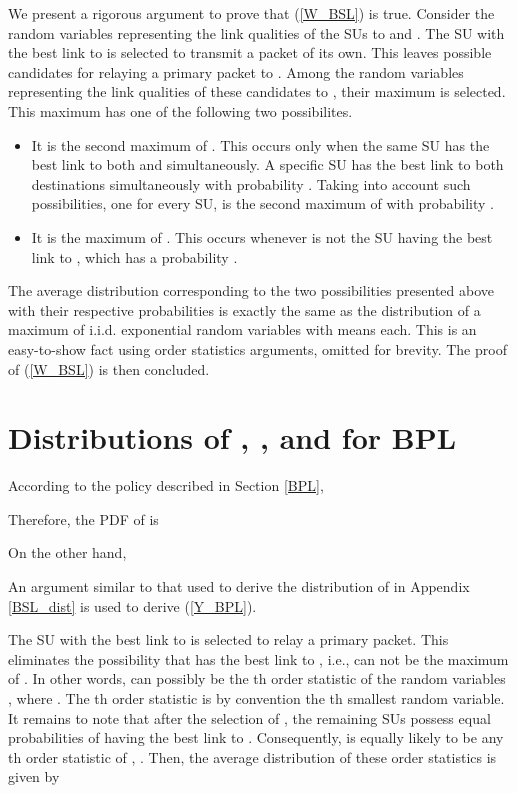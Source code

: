 \documentclass[journal,twocolumn]{IEEEtran}
\begin{document}
We present a rigorous argument to prove that (\ref{W_BSL}) is true. Consider the  random variables representing the link qualities of the  SUs to  and . The SU with the best link to  is selected to transmit a packet of its own. This leaves  possible candidates for relaying a primary packet to . Among the  random variables representing the link qualities of these candidates to , their maximum is selected. This maximum has one of the following two possibilites. 
\begin{itemize}
\item It is the second maximum of . This occurs only when the same SU has the best link to both  and  simultaneously. A specific SU has the best link to both destinations simultaneously with probability . Taking into account  such possibilities, one for every SU,  is the second maximum of  with probability . 
\item It is the maximum of . This occurs whenever  is not the SU having the best link to , which has a probability .       
\end{itemize}      
The average distribution corresponding to the two possibilities presented above with their respective probabilities is exactly the same as the distribution of a maximum of  i.i.d. exponential random variables with means  each. This is an easy-to-show fact using order statistics arguments, omitted for brevity. The proof of (\ref{W_BSL}) is then concluded. 


\section{Distributions of , , and  for BPL} \label{BPL_dist}
According to the policy described in Section \ref{BPL}, 

Therefore, the PDF of  is
     
On the other hand, 
 
An argument similar to that used to derive the distribution of  in Appendix \ref{BSL_dist} is used to derive (\ref{Y_BPL}).

The SU with the best link to  is selected to relay a primary packet. This eliminates the possibility that  has the best link to , i.e.,  can not be the maximum of . In other words,  can possibly be the th order statistic of the  random variables , where . The th order statistic is by convention the th smallest random variable.   
It remains to note that after the selection of , the remaining  SUs possess equal probabilities of having the best link to . Consequently,  is equally likely to be any th order statistic of , . Then, the average distribution of these order statistics is given by 
   
\end{document}
